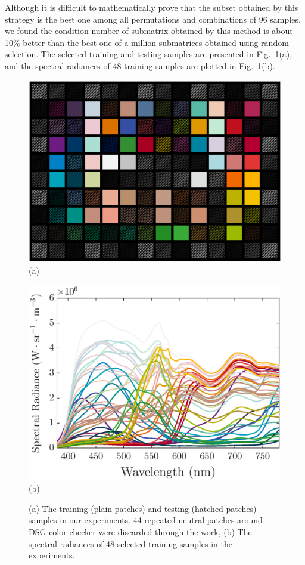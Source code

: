 \documentclass[9pt,twocolumn,twoside]{osajnl}
\begin{document}
Although it is difficult to mathematically prove that the subset obtained by this strategy is the best one among all permutations and combinations of 96 samples, we found the condition number of submatrix obtained by this method is about 10\% better than the best one of a million submatrices obtained using random selection. The selected training and testing samples are presented in Fig.~\ref{fig:9}(a), and the spectral radiances of 48 training samples are plotted in Fig.~\ref{fig:9}(b).

\begin{figure}[tbp]
	\centering
	\begin{minipage}[b]{0.5\linewidth}
		\centering
		\includegraphics[width=\linewidth]{Fig9a}\\
		(a)
	\end{minipage}%
	\begin{minipage}[b]{0.5\linewidth}
		\centering
		\includegraphics[width=\linewidth]{Fig9b}\\
		(b)
	\end{minipage}
	\caption{(a) The training (plain patches) and testing (hatched patches) samples in our experiments. 44 repeated neutral patches around DSG color checker were discarded through the work, (b) The spectral radiances of 48 selected training samples in the experiments.}
	\label{fig:9}
\end{figure}
\end{document}
